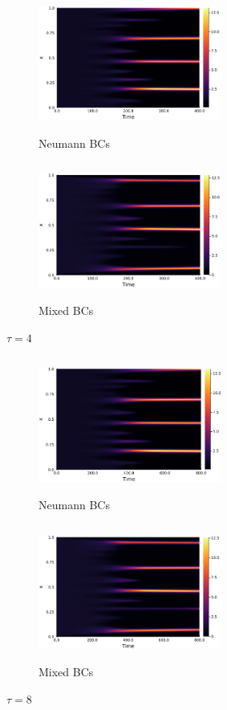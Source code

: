 \documentclass[12pt,a4paper]{article}
\begin{document}
\begin{figure}[H]
        \begin{subfigure}[b]{0.45\linewidth}
            \centering
            \includegraphics[width=6cm,height = 4.5cm]{t4neumannfixed.png}
            \caption{Neumann BCs}
            \label{}
        \end{subfigure}
        \hfill
        \begin{subfigure}[b]{0.45\linewidth}
            \centering
            \includegraphics[width=6cm,height = 4.5cm]{t4mixedfixed.png}
            \caption{Mixed BCs}
            \label{}
        \end{subfigure}
        \caption{$\tau=4$}
    \end{figure}
    \begin{figure}[H]
        \begin{subfigure}[b]{0.45\linewidth}
            \centering
            \includegraphics[width=6cm,height = 4.5cm]{t8neumannfixed.png}
            \caption{Neumann BCs}
            \label{}
        \end{subfigure}
        \hfill
        \begin{subfigure}[b]{0.45\linewidth}
            \centering
            \includegraphics[width=6cm,height = 4.5cm]{t8mixedfixed.png}
            \caption{Mixed BCs}
            \label{}
        \end{subfigure}
        \caption{$\tau=8$}
    \label{}
\end{figure}
\end{document}
